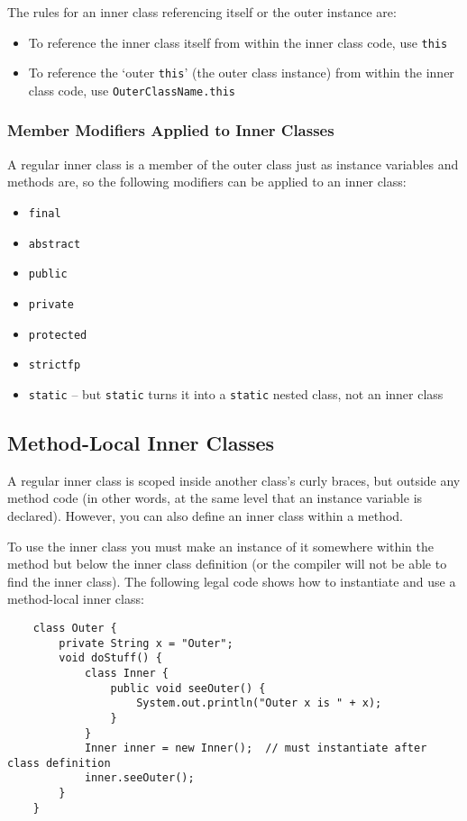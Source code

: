 The rules for an inner class referencing itself or the outer instance are:
\begin{itemize}
    \item To reference the inner class itself from within the inner class code, 
    use \verb#this#
    \item To reference the `outer \verb#this#' (the outer class instance) from 
    within the inner class code, use \verb#OuterClassName.this#
\end{itemize}

\subsubsection{Member Modifiers Applied to Inner Classes}
A regular inner class is a member of the outer class just as instance variables 
and methods are, so the following modifiers can be applied to an inner class:
\begin{itemize}
    \item \verb#final#
    \item \verb#abstract#
    \item \verb#public#
    \item \verb#private#
    \item \verb#protected#
    \item \verb#strictfp#
    \item \verb#static# -- but \verb#static# turns it into a \verb#static# 
    nested class, not an inner class
\end{itemize}

\subsection{Method-Local Inner Classes}
A regular inner class is scoped inside another class's curly braces, but 
outside any method code (in other words, at the same level that an instance 
variable is declared). However, you can also define an inner class within a 
method.

To use the inner class you must make an instance of it somewhere within the 
method but below the inner class definition (or the compiler will not be able 
to find the inner class). The following legal code shows how to instantiate and 
use a method-local inner class:
\begin{verbatim}
    class Outer {
        private String x = "Outer";
        void doStuff() {
            class Inner {
                public void seeOuter() {
                    System.out.println("Outer x is " + x);
                }
            }
            Inner inner = new Inner();  // must instantiate after class definition
            inner.seeOuter();
        }
    }
\end{verbatim}

